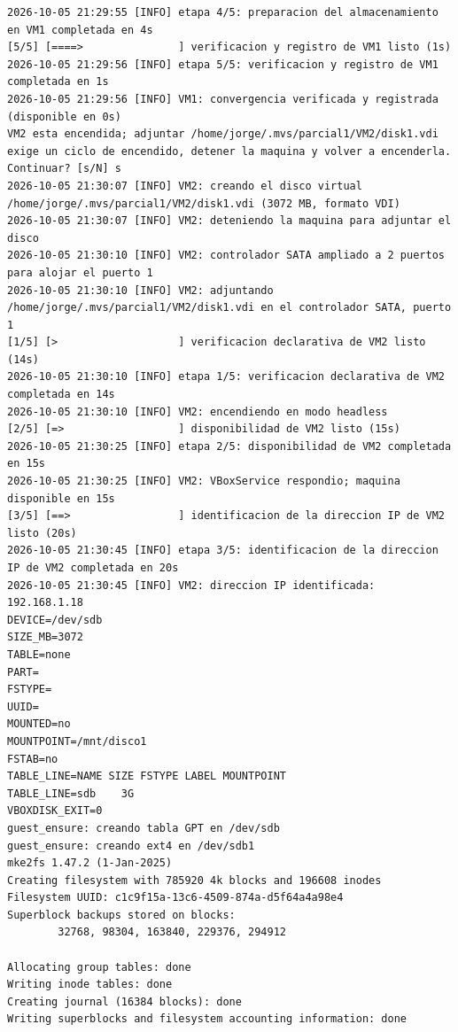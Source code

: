 \begin{lstlisting}[caption={Prueba~2: traza de \texttt{apply} sobre \texttt{VM1} y \texttt{VM2} y estado final con \texttt{status}}, label={lst:prueba2}, basicstyle=\ttfamily\footnotesize, numbers=none, language={}]
2026-10-05 21:29:55 [INFO] etapa 4/5: preparacion del almacenamiento en VM1 completada en 4s
[5/5] [====>               ] verificacion y registro de VM1 listo (1s)
2026-10-05 21:29:56 [INFO] etapa 5/5: verificacion y registro de VM1 completada en 1s
2026-10-05 21:29:56 [INFO] VM1: convergencia verificada y registrada (disponible en 0s)
VM2 esta encendida; adjuntar /home/jorge/.mvs/parcial1/VM2/disk1.vdi exige un ciclo de encendido, detener la maquina y volver a encenderla. Continuar? [s/N] s
2026-10-05 21:30:07 [INFO] VM2: creando el disco virtual /home/jorge/.mvs/parcial1/VM2/disk1.vdi (3072 MB, formato VDI)
2026-10-05 21:30:07 [INFO] VM2: deteniendo la maquina para adjuntar el disco
2026-10-05 21:30:10 [INFO] VM2: controlador SATA ampliado a 2 puertos para alojar el puerto 1
2026-10-05 21:30:10 [INFO] VM2: adjuntando /home/jorge/.mvs/parcial1/VM2/disk1.vdi en el controlador SATA, puerto 1
[1/5] [>                   ] verificacion declarativa de VM2 listo (14s)
2026-10-05 21:30:10 [INFO] etapa 1/5: verificacion declarativa de VM2 completada en 14s
2026-10-05 21:30:10 [INFO] VM2: encendiendo en modo headless
[2/5] [=>                  ] disponibilidad de VM2 listo (15s)
2026-10-05 21:30:25 [INFO] etapa 2/5: disponibilidad de VM2 completada en 15s
2026-10-05 21:30:25 [INFO] VM2: VBoxService respondio; maquina disponible en 15s
[3/5] [==>                 ] identificacion de la direccion IP de VM2 listo (20s)
2026-10-05 21:30:45 [INFO] etapa 3/5: identificacion de la direccion IP de VM2 completada en 20s
2026-10-05 21:30:45 [INFO] VM2: direccion IP identificada: 192.168.1.18
DEVICE=/dev/sdb
SIZE_MB=3072
TABLE=none
PART=
FSTYPE=
UUID=
MOUNTED=no
MOUNTPOINT=/mnt/disco1
FSTAB=no
TABLE_LINE=NAME SIZE FSTYPE LABEL MOUNTPOINT
TABLE_LINE=sdb    3G
VBOXDISK_EXIT=0
guest_ensure: creando tabla GPT en /dev/sdb
guest_ensure: creando ext4 en /dev/sdb1
mke2fs 1.47.2 (1-Jan-2025)
Creating filesystem with 785920 4k blocks and 196608 inodes
Filesystem UUID: c1c9f15a-13c6-4509-874a-d5f64a4a98e4
Superblock backups stored on blocks:
        32768, 98304, 163840, 229376, 294912

Allocating group tables: done
Writing inode tables: done
Creating journal (16384 blocks): done
Writing superblocks and filesystem accounting information: done


\end{lstlisting}
